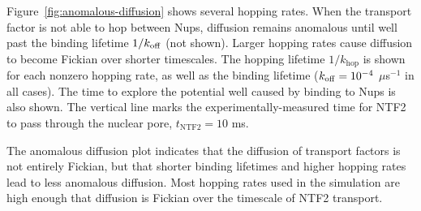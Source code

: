 Figure~\ref{fig:anomalous-diffusion} shows several hopping rates.  When the transport factor is not able to hop between Nups, diffusion remains anomalous until well past the binding lifetime $1/k_{\rm off}$ (not shown).  Larger hopping rates cause diffusion to become Fickian over shorter timescales.  The hopping lifetime $1/k_\mathrm{hop}$ is shown for each nonzero hopping rate, as well as the binding lifetime ($k_{\rm off} = 10^{-4}$ $\mu$s$^{-1}$ in all cases).  The time to explore the potential well caused by binding to Nups is also shown.  The vertical line marks the experimentally-measured time for NTF2 to pass through the nuclear pore, $t_\mathrm{NTF2} = 10$ ms.

The anomalous diffusion plot indicates that the diffusion of transport factors is not entirely Fickian, but that shorter binding lifetimes and higher hopping rates lead to less anomalous diffusion.  Most hopping rates used in the simulation are high enough that diffusion is Fickian over the timescale of NTF2 transport.




